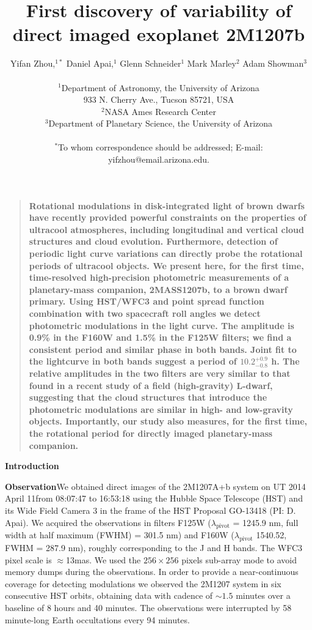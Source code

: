 \documentclass[12pt]{article}
\title{First discovery of variability of direct imaged exoplanet 2M1207b}
\author
{Yifan Zhou,$^{1\ast}$ Daniel Apai,$^{1}$ Glenn Schneider$^{1}$ Mark
  Marley$^{2}$ Adam Showman$^{3}$\\
\\
\normalsize{$^{1}$Department of Astronomy, the University of Arizona}\\
\normalsize{933 N. Cherry Ave., Tucson 85721, USA}\\
\normalsize{$^{2}$NASA Ames Research Center}\\
\normalsize{$^{3}$Department of Planetary Science, the University of Arizona}\\
\\
\normalsize{$^\ast$To whom correspondence should be addressed; E-mail:
  yifzhou@email.arizona.edu.}
}
\date{}
\newenvironment{sciabstract}{%
\begin{quote} \bf}
{\end{quote}}
\begin{document}
 


\baselineskip24pt


\maketitle 




\begin{sciabstract}
Rotational modulations in disk-integrated light of
brown dwarfs have recently provided powerful constraints on the
properties of ultracool atmospheres, including longitudinal and
vertical cloud structures and cloud evolution. Furthermore, detection
of periodic light curve variations can directly probe the rotational
periods of ultracool objects. We present here, for the first time, time-resolved high-precision
photometric measurements of a planetary-mass companion, 2MASS1207b, to
a brown dwarf primary. Using HST/WFC3 and point spread function %
combination with two spacecraft roll angles we detect photometric
modulations in the light curve. The amplitude is 0.9\% in the F160W
and 1.5\% in the F125W filters; we find a consistent period and
similar phase in both bands. Joint fit to the lightcurve in both bands
suggest a period of $10.2^{+0.9}_{-0.8}$ h. The relative amplitudes in the two
filters are very similar to that found in a recent study of a field
(high-gravity) L-dwarf, suggesting that the cloud structures that
introduce the photometric modulations are similar in high- and
low-gravity objects. Importantly, our study also measures, for the
first time, the rotational period for directly imaged planetary-mass
companion.
\end{sciabstract}

\textbf{Introduction}

\textbf{Observation}We obtained direct images of the 2M1207A+b
system on UT 2014 April 11from 08:07:47 to 16:53:18 using the Hubble
Space Telescope (HST) and its Wide Field Camera 3 \cite[WFC3,
][]{Kimble2008} in the frame of the HST Proposal GO-13418 (PI:
D. Apai). We acquired the observations in filters F125W
($\lambda_{\mbox{pivot}}$ = 1245.9 nm, full width at half maximum
(FWHM) = 301.5 nm) and F160W ($\lambda_{\mbox{pivot}}$ 1540.52, FWHM =
287.9 nm), roughly corresponding to the J and H bands. The WFC3 pixel
scale is $\approx$13mas. We used the $256\times256$ pixels sub-array
mode to avoid memory dumps during the observations.  In order to
provide a near-continuous coverage for detecting modulations we
observed the 2M1207 system in six consecutive HST orbits, obtaining
data with cadence of $\sim1.5$ minutes over a baseline of 8 hours and
40 minutes. The observations were interrupted by 58 minute-long Earth
occultations every 94 minutes.
\end{document}
